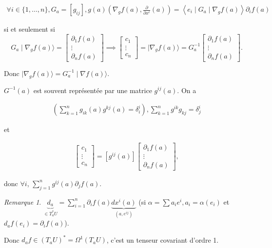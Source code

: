 \documentclass[french]{article}
\theoremstyle{definition}
\theoremstyle{remark}
\newtheorem*{remark}{Remarque}
\begin{document}
\begin{gather*}
  \forall i \in \{1, \dots, n \}, G_a = [g _{ij}], g(a) \left(\nabla_g f(a), \frac{\partial  }{\partial x ^{i}}(a)  \right) = \left\langle e_i \mid G_a \mid \nabla_g f(a) \right\rangle \partial_i f(a)
\end{gather*}

si et seulement si \[G_a \mid \nabla _{g}f(a) \rangle  = \left[\begin{matrix}
  \partial_1 f(a) \\
  \vdots \\
  \partial_n f(a)
\end{matrix}\right] \implies \left[\begin{matrix}
  c_1 \\
  \vdots \\
  c_n
\end{matrix}\right] = \mid \nabla_g f(a) \rangle = G_a ^{-1} \left[\begin{matrix}
  \partial_1 f(a) \\
  \vdots \\
  \partial_n f(a)
\end{matrix}\right].\]

Donc \(\mid \nabla _{g}f(a)\rangle = G_a ^{-1} \mid \nabla f(a)\rangle\).

\(G ^{-1}(a)\) est souvent représentée par une matrice \(g ^{ij}(a)\).  On a

\begin{gather*}
  \left(\sum_{k=1}^{n} g _{ik}(a)g ^{kj}(a) = \delta _{i}^{i} \right), \sum_{k=1}^{n} g ^{ik}g _{kj} = \delta _{j}^{i}
\end{gather*}

et

\begin{gather*}
  \left[\begin{matrix}
    c_1 \\
    \vdots \\
    c_n
  \end{matrix}\right] = [g ^{ij}(a)] \begin{bmatrix}
    \partial_1 f(a) \\
    \vdots \\
    \partial_n f(a)
\end{bmatrix},
\end{gather*}

donc \(\forall i\), \(\displaystyle \sum_{j=1}^{n} g ^{ij}(a) \partial_j f(a)\).

\begin{remark}
  \(\underbrace{d_a}_{\in T_a ^{*}U} = \displaystyle \sum_{i=1}^{n} \partial_i f(a) \underbrace{d x^{i}(a)}_{(a, e ^{ij})}\) (si \(\alpha = \displaystyle \sum a_i e ^{i}, a_i = \alpha(e_i)\) et \(d_a f(e_i) = \partial_i f(a)\)).

  Donc \(d_a f \in (T_a U)^{*} = \Omega ^{1}(T_a U)\), c'est un tenseur covariant d'ordre 1.
\end{remark}
\end{document}
